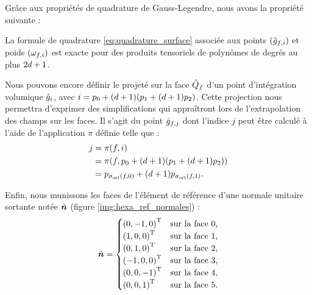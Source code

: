 Grâce aux propriétés de quadrature de Gauss-Legendre, nous avons la propriété
suivante :
\begin{proposition}
	La formule de quadrature \eqref{eq:quadrature_surface} associée aux points
	$(\hat{g}_{f,i})$ et poids $(\omega_{f,i})$ est exacte pour des produits
	tensoriels de polynômes de degrés au plus $2 d + 1$.
\end{proposition}

Nous pouvons encore définir le projeté sur la face $\hat{Q}_f$
d’un point d’intégration volumique $\hat{g}_{i}$, avec
$i = {p_{0}} + (d + 1)({p_{1}} + (d + 1){p_{2}})$.
Cette projection nous permettra d'exprimer des simplifications qui appraîtront
lors de l'extrapolation des champs sur les faces.
Il s'agit du point $\hat{g}_{f,j}$ dont l'indice
$j$ peut être calculé à l'aide de l’application $\pi$ définie telle que :
\begin{equation}
	\begin{aligned}
		j &= \pi (f,i) \\
		&= \pi (f,{p_{0}} + (d + 1)({p_{1}} + (d + 1){p_{2}})) \\
		&= {p_{\sigma_{\mathrm{ori}}(f,0)}} + (d + 1) {p_{\sigma_{\mathrm{ori}}(f,1)}} .
	\end{aligned}
\end{equation}

Enfin, nous munissons les faces de l’élément de référence d’une normale
unitaire sortante notée $\hat{\bm{n}}$ (figure \ref{img:hexa_ref_normales}) :
\begin{equation}
	\hat{\bm{n}} =
	\begin{cases}
		\left(0,-1,0\right)^{\mathrm{T}} & \text{sur la face 0,} \\
		\left(1,0,0\right)^{\mathrm{T}} & \text{sur la face 1,} \\
		\left(0,1,0\right)^{\mathrm{T}} & \text{sur la face 2,} \\
		\left(-1,0,0\right)^{\mathrm{T}} & \text{sur la face 3,} \\
		\left(0,0,-1\right)^{\mathrm{T}} & \text{sur la face 4,} \\
		\left(0,0,1\right)^{\mathrm{T}} & \text{sur la face 5.}
	\end{cases}
\end{equation}


